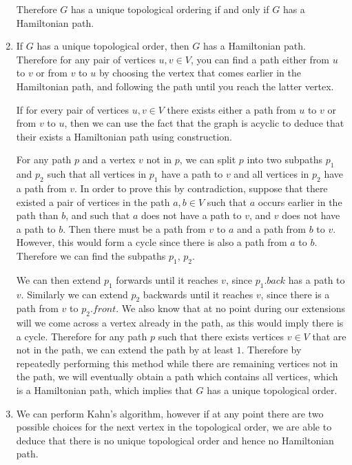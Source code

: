 \documentclass{article}
\begin{document}
\begin{solution}
\begin{enumerate}[label = (\alph*)]
    Therefore $G$ has a unique topological ordering if and only if $G$ has a Hamiltonian path.
    \pagebreak
    \item 
    If $G$ has a unique topological order, then $G$ has a Hamiltonian path. Therefore for any pair of vertices $u,v\in V$, 
    you can find a path either from $u$ to $v$ or from $v$ to $u$ by choosing the vertex that comes 
    earlier in the Hamiltonian path, and following the path until you reach the latter vertex.

    If for every pair of vertices $u,v\in V$ there exists either a path from $u$ to $v$ or from $v$ to $u$, 
    then we can use the fact that the graph is acyclic to deduce that their exists a Hamiltonian path using construction.
    
    
    For any path $p$ and a vertex $v$ not in $p$, we can split $p$ into two subpaths $p_1$ and $p_2$ such that 
    all vertices in $p_1$ have a path to $v$ and all vertices in $p_2$ have a path from $v$. In order to prove this 
    by contradiction, suppose that there existed a pair of vertices in the path $a, b\in V$ such that $a$ occurs earlier in the path 
    than $b$, and such that $a$ does not have a path to $v$, and $v$ does not have a path to $b$.
    Then there must be a path from $v$ to $a$ and a path from $b$ to $v$. However, this would form a cycle since there is also a path from $a$ to $b$.
    Therefore we can find the subpaths $p_1$, $p_2$. 
    
    We can then extend $p_1$ forwards until it reaches $v$, since $p_1.\textit{back}$ has 
    a path to $v$. Similarly we can extend $p_2$ backwards until it reaches $v$, since there is a path from $v$ to $p_2.\textit{front}$. 
    We also know that at no point during our extensions will we come across a vertex already in the path, as this would imply there is a cycle.
    Therefore for any path $p$ such that there exists vertices $v\in V$ that are not in the path, we can extend the path by at least $1$.
    Therefore by repeatedly performing this method while there are remaining vertices not in the path, we will eventually obtain a path which contains all vertices, 
    which is a Hamiltonian path, which implies that $G$ has a unique topological order.

    \item 
    We can perform Kahn's algorithm, however if at any point there are two possible choices for the next vertex in the topological order,
    we are able to deduce that there is no unique topological order and hence no Hamiltonian path.


\end{enumerate}
\end{solution}
\end{document}
